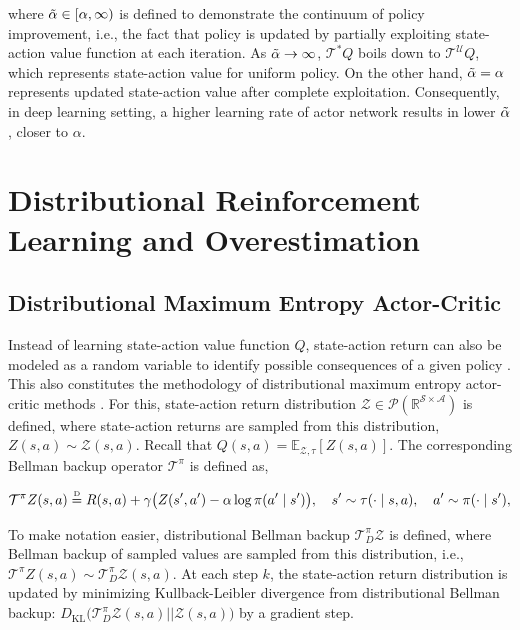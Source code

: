 \documentclass[10pt]{article} %
\newcommand\disteq{\mathrel{\stackrel{\makebox[0pt]{\mbox{\normalfont\tiny D}}}{=}}}
\begin{document}
where $\Tilde{\alpha} \in [ \alpha, \infty ) $ is defined to demonstrate the continuum of policy improvement, i.e., the fact that policy is updated by partially exploiting state-action value function at each iteration. As $\Tilde{\alpha} \rightarrow \infty$, $\mathcal{T}^{*}Q$ boils down to $\mathcal{T}^{\mathcal{U}}Q$, which represents state-action value for uniform policy. On the other hand, $\Tilde{\alpha} = \alpha$ represents updated state-action value after complete exploitation. Consequently, in deep learning setting, a higher learning rate of actor network results in lower $\Tilde{\alpha}$, closer to $\alpha$. 

\section{Distributional Reinforcement Learning and Overestimation}

\subsection{Distributional Maximum Entropy Actor-Critic}
Instead of learning state-action value function $Q$, state-action return can also be modeled as a random variable to identify possible consequences of a given policy \citep{bellemare2017distributional}. This also constitutes the methodology of distributional maximum entropy actor-critic methods \citep{duan2021distributional, ma2025dsac}. For this, state-action return distribution  $\mathcal{Z}\in\mathcal{P}(\mathbb{R}^{\mathcal{S}\times\mathcal{A}})$ is defined, where state-action returns are sampled from this distribution, $Z(s, a) \sim \mathcal{Z}(s, a)$. Recall that $Q(s,a) = \mathbb{E}_{\mathcal{Z}, \tau} [ Z(s,a) ]$. The corresponding Bellman backup operator $\mathcal{T}^{\pi}$ is defined as, 

\begin{equation}
	\label{eqn:z_eval}
	\mathcal{T}^{\pi} Z(s,a) \disteq R(s,a) + \gamma \big( Z(s',a') - \alpha \log \pi(a' \mid s') \big), \quad s'\sim\tau(\cdot \mid s,a), \quad a' \sim \pi(\cdot \mid s'), 
\end{equation}

To make notation easier, distributional Bellman backup $\mathcal{T}^{\pi}_{D}\mathcal{Z}$ is defined, where Bellman backup of sampled values are sampled from this distribution, i.e., $\mathcal{T}^{\pi} Z(s,a) \sim \mathcal{T}^{\pi}_{D}\mathcal{Z}(s, a)$. At each step $k$, the state-action return distribution is updated by minimizing Kullback-Leibler divergence from distributional Bellman backup: $D_{\mathrm{KL}} \big( \mathcal{T}^{\pi}_{D}\mathcal{Z}(s, a) || \mathcal{Z}(s, a) \big)$ by a gradient step. 
\end{document}
